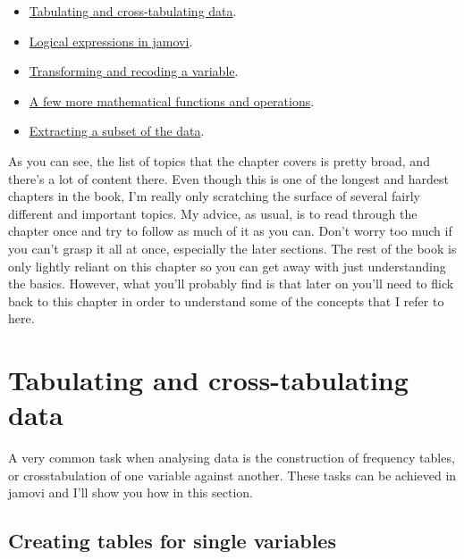 \documentclass[
  a4paper,
]{book}
\providecommand{\tightlist}{%
  \setlength{\itemsep}{0pt}\setlength{\parskip}{0pt}}\usepackage{longtable,booktabs,array}
\begin{document}
\begin{itemize}
\tightlist
\item
  \protect\hyperlink{sec-Tabulating-and-cross-tabulating-data}{Tabulating
  and cross-tabulating data}.
\item
  \protect\hyperlink{logical-expressions-in-jamovi}{Logical expressions
  in jamovi}.
\item
  \protect\hyperlink{sec-Transforming-and-recoding-a-variable}{Transforming
  and recoding a variable}.
\item
  \protect\hyperlink{a-few-more-mathematical-functions-and-operations}{A
  few more mathematical functions and operations}.
\item
  \protect\hyperlink{extracting-a-subset-of-the-data}{Extracting a
  subset of the data}.
\end{itemize}

As you can see, the list of topics that the chapter covers is pretty
broad, and there's a lot of content there. Even though this is one of
the longest and hardest chapters in the book, I'm really only scratching
the surface of several fairly different and important topics. My advice,
as usual, is to read through the chapter once and try to follow as much
of it as you can. Don't worry too much if you can't grasp it all at
once, especially the later sections. The rest of the book is only
lightly reliant on this chapter so you can get away with just
understanding the basics. However, what you'll probably find is that
later on you'll need to flick back to this chapter in order to
understand some of the concepts that I refer to here.

\hypertarget{sec-Tabulating-and-cross-tabulating-data}{%
\section{Tabulating and cross-tabulating
data}\label{sec-Tabulating-and-cross-tabulating-data}}

A very common task when analysing data is the construction of frequency
tables, or crosstabulation of one variable against another. These tasks
can be achieved in jamovi and I'll show you how in this section.

\hypertarget{creating-tables-for-single-variables}{%
\subsection{Creating tables for single
variables}\label{creating-tables-for-single-variables}}
\end{document}
